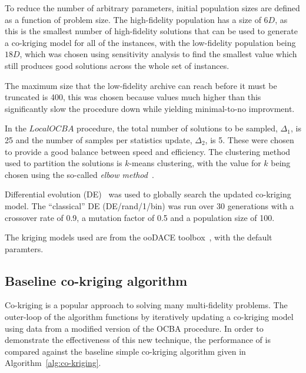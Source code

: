 To reduce the number of arbitrary parameters, initial population sizes are defined as a function of problem size. The high-fidelity population has a size of $6D$, as this is the smallest number of high-fidelity solutions that can be used to generate a co-kriging model for all of the instances, with the low-fidelity population being $18D$, which was chosen using sensitivity analysis to find the smallest value which still produces good solutions across the whole set of instances.

The maximum size that the low-fidelity archive can reach before it must be truncated is 400, this was chosen because values much higher than this significantly slow the procedure down while yielding minimal-to-no improvment. 

In the $LocalOCBA$ procedure, the total number of solutions to be sampled, $\Delta_1$, is 25 and the number of samples per statistics update, $\Delta_2$, is 5. These were chosen to provide a good balance between speed and efficiency. The clustering method used to partition the solutions is $k$-means clustering, with the value for $k$ being chosen using the so-called \emph{elbow method}~\cite{leonard1990finding}.

Differential evolution (DE)~\cite{storn1997differential} was used to globally search the updated co-kriging model. The ``classical'' DE (DE/rand/1/bin) was run over 30 generations with a crossover rate of 0.9, a mutation factor of 0.5 and a population size of 100.

The kriging models used are from the ooDACE toolbox~\cite{oodace}, with the default paramters.

\subsection{Baseline co-kriging algorithm}
Co-kriging is a popular approach to solving many multi-fidelity problems. The outer-loop of the \AlgName{} algorithm functions by iteratively updating a co-kriging model using data from a modified version of the OCBA procedure. In order to demonstrate the effectiveness of this new technique, the performance of \AlgName{} is compared against the baseline simple co-kriging algorithm given in Algorithm~\ref{alg:co-kriging}.


